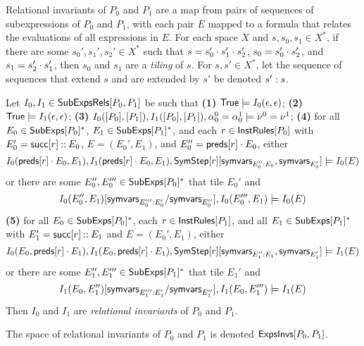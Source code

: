 Relational invariants of $P_0$ and $P_1$ are a map from pairs of
sequences of subexpressions of $P_0$ and $P_1$, with each pair $E$
mapped to a formula that relates the evaluations of all expressions in
$E$.
%
For each space $X$ and $s, s_0, s_1 \in X^{*}$, if there are some
$s_0', s_1', s_2' \in X^{*}$ such that $s = s_0' \cdot s_1' \cdot
s_2'$, $s_0 = s_0' \cdot s_2'$, and $s_1 = s_2' \cdot s_1'$, then
$s_0$ and $s_1$ are a \emph{tiling} of $s$.
%
For $s, s' \in X^{*}$, let the sequence of sequences that extend $s$
and are extended by $s'$ be denoted $s' : s$.
%
\begin{defn}
  \label{defn:rel-invs}
  Let $I_0, I_1 \in \mathsf{SubExpsRels}[ P_0, P_1 ]$ be such that %
  \textbf{(1)} $\mathsf{True} \models I_0( \epsilon, \epsilon )$; %
  \textbf{(2)} $\mathsf{True} \models I_1(\epsilon, \epsilon)$;
  \textbf{(3)} $I_0([ P_0 ], [ P_1 ] ), I_1( [ P_0 ], [ P_1 ]),
  \alpha^0_0 = \alpha^1_0 \models \nu^0 = \nu^1$;
  \textbf{(4)} for all $E_0 \in \mathsf{SubExps}[ P_0 ]^{*}$, %
  $E_1 \in \mathsf{SubExps}[ P_1 ]^{*}$, and %
  each $r \in \mathsf{InstRules}[ P_0 ]$ with $E_0' = \mathsf{succ}[ r ] \mathbin{::} E_0$,
  $E = (E_0', E_1)$, and $E_0'' = \mathsf{preds}[  r  ] \cdot E_0$, either
  \[ I_0(\rulepreds{ r } \concat E_0, E_1), %
  I_1(\rulepreds{ r } \concat E_0, E_1), %
  \subs{ \symstep{ r } }{ %
    \symvars{ \seqrange{ E_0'' }{ E_0 } }, \symvars{ E_0' } }
  \entails I_0( E )
  \]
  or there are some $E_0'', E_0''' \in \mathsf{SubExps}[ P_0 ]^{*}$ that tile
  $E_0'$ and
  \[ \replace{ I_0(E_0'', E_1) }{ %
    \symvars{ E_0'' } }{ \symvars{ \seqrange{E_0'''}{ E_0' } } }, %
  I_0(E_0''', E_1) \entails I_0(E) \]
  \textbf{(5)} for all $E_0 \in \mathsf{SubExps}[ P_0 ]^{*}$, %
  each $r \in \mathsf{InstRules}[  P_1  ]$, and all $E_1 \in \mathsf{SubExps}[ P_1 ]^{*}$
  with $E_1' = \mathsf{succ}[  r  ] \mathbin{::} E_1$ and $E = (E_0', E_1)$, either
  \[ I_0(E_0, \rulepreds{ r } \concat E_1), %
  I_1(E_0, \rulepreds{ r } \concat E_1),
  \subs{ \symstep{ r } }{ %
    \symvars{ \seqrange{ E_1'' }{ E_1 } }, \symvars{ E_1' } }
  \entails I_1(E) \] 
  or there are some $E_1'', E_1''' \in \mathsf{SubExps}[  P_1  ]^{*}$ that tile
  $E_1'$ and
  \[ \replace{ I_1(E_0, E_1'') }{ %
    \symvars{ E_1'' } }{ \symvars{ \seqrange{ E_1''' }{ E_1 ' } } }, %
  I_1(E_0, E_1''') \entails I_1(E)
  \]
  Then $I_0$ and $I_1$ are \emph{relational invariants} of $P_0$ and
  $P_1$.
\end{defn}
%
The space of relational invariants of $P_0$ and $P_1$ is denoted
$\mathsf{ExpsInvs}[ P_0, P_1 ]$.

